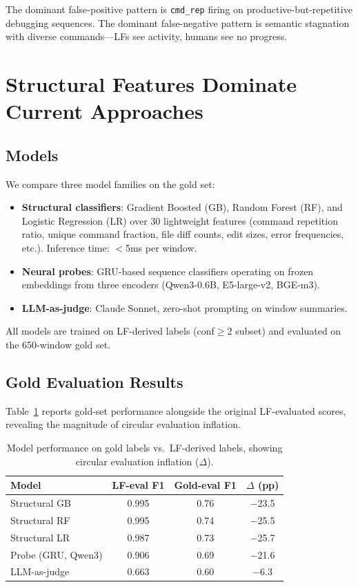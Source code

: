 \documentclass[11pt]{article}
\begin{document}
The dominant false-positive pattern is \texttt{cmd\_rep} firing on productive-but-repetitive debugging sequences. The dominant false-negative pattern is semantic stagnation with diverse commands---LFs see activity, humans see no progress.

\section{Structural Features Dominate Current Approaches}
\label{sec:structural-eval}

\subsection{Models}

We compare three model families on the gold set:

\begin{itemize}[leftmargin=*,itemsep=1pt]
\item \textbf{Structural classifiers}: Gradient Boosted (GB), Random Forest (RF), and Logistic Regression (LR) over 30 lightweight features (command repetition ratio, unique command fraction, file diff counts, edit sizes, error frequencies, etc.). Inference time: $<$5ms per window.
\item \textbf{Neural probes}: GRU-based sequence classifiers operating on frozen embeddings from three encoders (Qwen3-0.6B, E5-large-v2, BGE-m3).
\item \textbf{LLM-as-judge}: Claude Sonnet, zero-shot prompting on window summaries.
\end{itemize}

All models are trained on LF-derived labels (conf$\geq$2 subset) and evaluated on the 650-window gold set.

\subsection{Gold Evaluation Results}

Table~\ref{tab:gold-eval} reports gold-set performance alongside the original LF-evaluated scores, revealing the magnitude of circular evaluation inflation.

\begin{table}[t]
\centering
\small
\caption{Model performance on gold labels vs.\ LF-derived labels, showing circular evaluation inflation ($\Delta$).}
\label{tab:gold-eval}
\begin{tabular}{lccc}
\toprule
Model & LF-eval F1 & Gold-eval F1 & $\Delta$ (pp) \\
\midrule
Structural GB & 0.995 & 0.76 & $-$23.5 \\
Structural RF & 0.995 & 0.74 & $-$25.5 \\
Structural LR & 0.987 & 0.73 & $-$25.7 \\
Probe (GRU, Qwen3) & 0.906 & 0.69 & $-$21.6 \\
LLM-as-judge & 0.663 & 0.60 & $-$6.3 \\
\bottomrule
\end{tabular}
\end{table}
\end{document}
